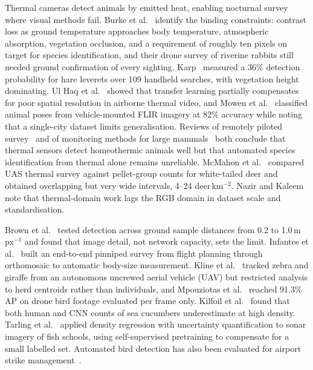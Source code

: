Thermal cameras detect animals by emitted heat, enabling nocturnal survey where visual methods
fail. Burke et al.~\cite{burke2019optimizing} identify the binding constraints: contrast loss
as ground temperature approaches body temperature, atmospheric absorption, vegetation
occlusion, and a requirement of roughly ten pixels on target for species identification, and
their drone survey of riverine rabbits still needed ground confirmation of every sighting.
Karp~\cite{karp2020detecting} measured a 36\% detection probability for hare leverets over 109
handheld searches, with vegetation height dominating. Ul Haq et al.~\cite{ulhaq2021automated}
showed that transfer learning partially compensates for poor spatial resolution in airborne
thermal video, and Mowen et al.~\cite{mowen2022improving} classified animal poses from
vehicle-mounted FLIR imagery at 82\% accuracy while noting that a single-city dataset limits
generalisation. Reviews of remotely piloted survey~\cite{hyun2020remotely} and of monitoring
methods for large mammals~\cite{prosekov2020methods} both conclude that thermal sensors detect
homeothermic animals well but that automated species identification from thermal alone remains
unreliable. McMahon et al.~\cite{mcmahon2021comparing} compared UAS thermal survey against
pellet-group counts for white-tailed deer and obtained overlapping but very wide intervals,
4--24 deer\,km$^{-2}$. Nazir and Kaleem~\cite{nazir2021advances} note that thermal-domain work
lags the RGB domain in dataset scale and standardisation.

Brown et al.~\cite{brown2022automated} tested detection across ground sample distances from
0.2 to 1.0\,m\,px$^{-1}$ and found that image detail, not network capacity, sets the limit.
Infantes et al.~\cite{infantes2022automated} built an end-to-end pinniped survey from flight
planning through orthomosaic to automatic body-size measurement.
Kline et al.~\cite{kline2024integrating} tracked zebra and giraffe from an autonomous uncrewed aerial vehicle (UAV) but
restricted analysis to herd centroids rather than individuals, and Mpouziotas et
al.~\cite{mpouziotas2023automated} reached 91.3\% AP on drone bird footage evaluated per frame
only. Kilfoil et al.~\cite{kilfoil2020using} found that both human and CNN counts of sea
cucumbers underestimate at high density. Tarling et al.~\cite{tarling2022deep} applied density
regression with uncertainty quantification to sonar imagery of fish schools, using
self-supervised pretraining to compensate for a small labelled set. Automated bird detection
has also been evaluated for airport strike management~\cite{oviedo2024automatic}.

